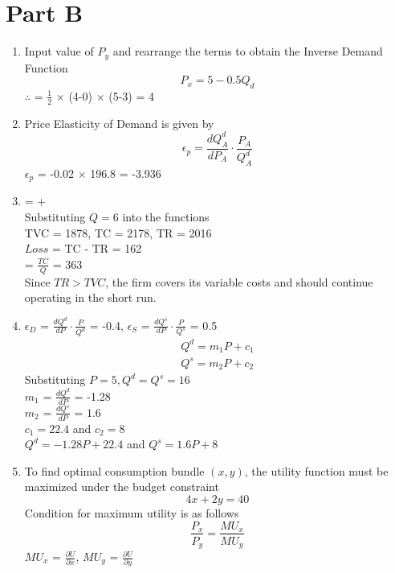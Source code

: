 \documentclass{article}
\begin{document}
\section*{Part B}
\begin{enumerate}
    \item
        Input value of $P_y$ and rearrange the terms to obtain the Inverse Demand Function
        \[
        P_x = 5 - 0.5Q_d
        \]
        $\therefore$  = \(\frac{1}{2}\) $\times$ (4-0) $\times$ (5-3) = 4
    \item 
        Price Elasticity of Demand is given by 
        \[
        \epsilon_p=\frac{dQ_A^d}{dP_A} \cdot \frac{P_A}{Q_A^d}
        \]
        $\epsilon_p$ = -0.02 $\times$ 196.8 = -3.936  
    \item 
         =  +  \\
        Substituting \( Q = 6 \) into the functions\\
        TVC = 1878, TC = 2178, TR = 2016 \\
        $Loss$ = TC - TR = 162 \\
         = \(\frac{TC}{Q}\) = 363 \\
        Since \( TR > TVC \), the firm covers its variable costs and should continue operating in the short run.
    \item 
        $\epsilon_D$ = \(\frac{dQ^d}{dP} \cdot \frac{P}{Q^d}\) = -0.4, 
        $\epsilon_S$ = \(\frac{dQ^s}{dP} \cdot \frac{P}{Q^s}\) = 0.5
        \begin{align}
        Q^d = m_1P+c_1 \\
        Q^s = m_2P+c_2  
        \end{align}
        Substituting $P=5, Q^d = Q^s = 16$ \\ 
        $m_1$ = \(\frac{dQ^d}{dP}\) = -1.28 \\
        $m_2$ = \(\frac{dQ^s}{dP}\) = $1.6$ \\
        $c_1 = 22.4$ and $c_2 = 8$ \\
        $Q^d = -1.28P+22.4$ and $Q^s = 1.6P+8$
    \item 
        To find optimal consumption bundle $(x,y)$, the utility function must be maximized under the budget constraint
        \[
        4x+2y=40
        \]
        Condition for maximum utility is as follows 
        \[
        \frac{P_x}{P_y} = \frac{MU_x}{MU_y} 
        \]
        $MU_x$ = \(\frac{\partial U}{\partial x}\), $MU_y$ = \(\frac{\partial U}{\partial y}\)\\

\end{enumerate}
\end{document}
